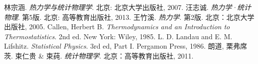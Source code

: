 \documentclass[UTF8]{ctexart}
\numberwithin{equation}{subsection}
\begin{document}
\begin{thebibliography}{99}
林宗涵. \textit{热力学与统计物理学}. 北京: 北京大学出版社, 2007.
汪志诚. \textit{热力学·统计物理}. 第5版. 北京: 高等教育出版社, 2013.
王竹溪. \textit{热力学}. 第2版. 北京：北京大学出版社, 2005.
Callen, Herbert B. \textit{Thermodynamics and an Introduction to Thermostatistics}. 2nd ed. New York: Wiley, 1985.
L. D. Landau and E. M. Lifshitz. \textit{Statistical Physics}. 3rd ed, Part I. Pergamon Press, 1986.
朗道, 栗弗席茨. 束仁贵 \& 束莼. \textit{统计物理学}. 北京：高等教育出版社, 2011.
\end{thebibliography}
\end{document}
